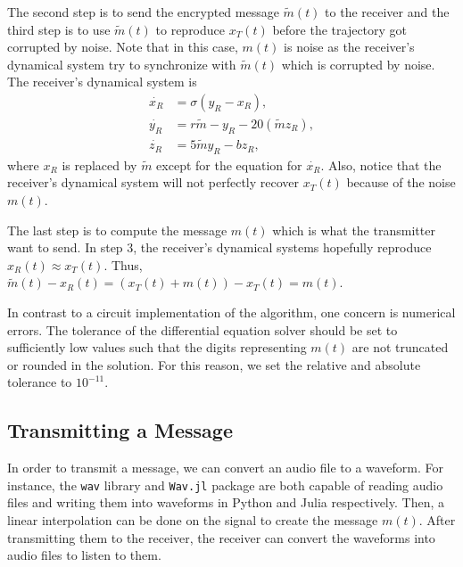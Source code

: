 \documentclass[12pt]{article}
\begin{document}
    The second step is to send the encrypted message $\widetilde{m}(t)$ to the receiver and the third step is to use $\widetilde{m}(t)$ to reproduce $x_T(t)$ before the trajectory got corrupted by noise. Note that in this case, $m(t)$ is noise as the receiver's dynamical system try to synchronize with $\widetilde{m}(t)$ which is corrupted by noise. The receiver's dynamical system is 
    \begin{equation*} 
      \begin{aligned}
        \dot{x_R} &= \sigma (y_R-x_R), \\
        \dot{y_R} &= r  \widetilde{m} - y_R - 20 (\widetilde{m}   z_R),\\
        \dot{z_R} &= 5 \widetilde{m} y_R - b  z_R,
      \end{aligned}
    \end{equation*}
    where $x_R$ is replaced by $\widetilde{m}$ except for the equation for $\dot{x_R}$. Also, notice that the receiver's dynamical system will not perfectly recover $x_T(t)$ because of the noise $m(t)$. 

    The last step is to compute the message $m(t)$ which is what the transmitter want to send. In step $3$, the receiver's dynamical systems hopefully reproduce $x_R(t) \approx x_T(t)$. Thus, $\widetilde{m}(t) - x_R(t) = (x_T(t) + m(t)) - x_T(t) = m(t)$. 

    In contrast to a circuit implementation of the algorithm, one concern is numerical errors. The tolerance of the differential equation solver should be set to sufficiently low values such that the digits representing $m(t)$ are not truncated or rounded in the solution. For this reason, we set the relative and absolute tolerance to $10^{-11}$. 

    \subsection{Transmitting a Message}
    In order to transmit a message, we can convert an audio file to a waveform. For instance, the \verb|wav| library and \verb|Wav.jl| package are both capable of reading audio files and writing them into waveforms in Python and Julia respectively. Then, a linear interpolation can be done on the signal to create the message $m(t)$. After transmitting them to the receiver, the receiver can convert the waveforms into audio files to listen to them. 
    
\end{document}
